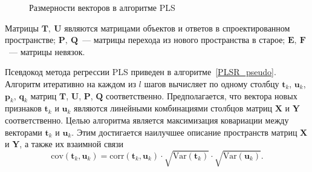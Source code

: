 \documentclass[12pt,twoside]{article}
\newcommand{\bY}{\mathbf{Y}}
\newcommand{\bX}{\mathbf{X}}
\newcommand{\bu}{\mathbf{u}}
\newcommand{\bt}{\mathbf{t}}
\newcommand{\bp}{\mathbf{p}}
\newcommand{\bq}{\mathbf{q}}
\newcommand{\bP}{\mathbf{P}}
\newcommand{\bT}{\mathbf{T}}
\newcommand{\bQ}{\mathbf{Q}}
\newcommand{\bE}{\mathbf{E}}
\newcommand{\bF}{\mathbf{F}}
\newcommand{\bU}{\mathbf{U}}
\begin{document}
\hspace{1cm}
\begin{figure}[H]
\centering
\footnotesize{
}
\caption{Размерности векторов в алгоритме PLS}
\end{figure}
Матрицы $\bT,\ \bU$ являются матрицами объектов и ответов в спроектированном пространстве; $\bP,\ \bQ$~--- матрицы перехода из нового пространства в старое; $\bE,\ \bF$~--- матрицы невязок. 

Псевдокод метода регрессии PLS приведен в алгоритме~\ref{PLSR_pseudo}. Алгоритм итеративно на каждом из $l$ шагов вычисляет по одному столбцу $\bt_k$, $\bu_k$, $\bp_k$, $\bq_k$ матриц $\bT$, $\bU$, $\bP$, $\bQ$ соответственно. Предполагается, что вектора новых признаков $\bt_k$ и $\bu_k$ являются линейными комбинациями столбцов матриц $\bX$ и $\bY$ соответственно.
Целью алгоритма является максимизация ковариации между векторами $\bt_k$ и $\bu_k$. Этим достигается наилучшее описание пространств матриц $\bX$ и $\bY$, а также их взаимной связи
\[
	\text{cov} (\bt_k, \bu_k) = \text{corr} (\bt_k, \bu_k) \cdot \sqrt{\text{Var}(\bt_k)} \cdot \sqrt{\text{Var}(\bu_k)}.
\]
\end{document}

